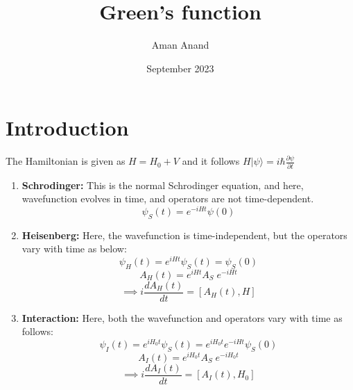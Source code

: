 \documentclass{article}
\title{Green's function}
\author{Aman Anand}
\date{September 2023}
\begin{document}
\maketitle

\section{Introduction}
The Hamiltonian is given as $H = H_0 + V$ and it follows
$H |\psi\rangle = i\hbar \frac{\partial \psi}{\partial t}$
\begin{enumerate}
    \item \textbf{Schrodinger:}  This is the normal Schrodinger equation, and here, wavefunction evolves in time, and operators are not time-dependent.
    \begin{equation}
        \psi_S(t) = e^{-iHt} \psi(0) 
    \end{equation}
    \item \textbf{Heisenberg:} Here, the wavefunction is time-independent, but the operators vary with time as below:
    \begin{equation}
        \psi_H(t) = e^{iHt} \psi_S(t) = \psi_S(0)
    \end{equation}
    \begin{equation}
        A_H(t) = e^{iHt}A_S \;e^{-iHt}
    \end{equation}
    \begin{equation}
        \implies i \frac{dA_H(t)}{dt} = [A_H(t), H]
    \end{equation}
    \item \textbf{Interaction:} Here, both the wavefunction and operators vary with time as follows:
    \begin{equation}
        \psi_I(t) = e^{iH_0t} \psi_S(t) = e^{iH_0t} e^{-iHt} \psi_S(0)
    \end{equation}
    \begin{equation}
        A_I(t) = e^{iH_0t}A_S \;e^{-iH_0t}
    \end{equation}
    \begin{equation}
        \implies  i \frac{dA_I(t)}{dt} = [A_I(t), H_0]
    \end{equation}
\end{enumerate}
\end{document}
